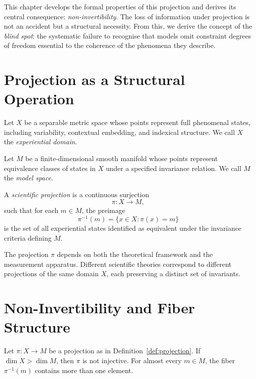 \documentclass[11pt,openany]{book}
\begin{document}
This chapter develops the formal properties of this
projection and derives its central consequence:
\emph{non-invertibility}. The loss of information under
projection is not an accident but a structural necessity.
From this, we derive the concept of the \emph{blind spot}:
the systematic failure to recognise that models omit
constraint degrees of freedom essential to the coherence of
the phenomena they describe.

\section{Projection as a Structural Operation}
\label{sec:projection-structure}

\begin{definition}
Let $X$ be a separable metric space whose points represent
full phenomenal states, including variability, contextual
embedding, and indexical structure. We call $X$ the
\emph{experiential domain}.
\end{definition}

\begin{definition}
Let $M$ be a finite-dimensional smooth manifold whose points
represent equivalence classes of states in $X$ under a
specified invariance relation. We call $M$ the
\emph{model space}.
\end{definition}

\begin{definition}[Projection]
\label{def:projection}
A \emph{scientific projection} is a continuous surjection
\[
  \pi : X \to M,
\]
such that for each $m \in M$, the preimage
\[
  \pi^{-1}(m) = \{x \in X : \pi(x) = m\}
\]
is the set of all experiential states identified as
equivalent under the invariance criteria defining $M$.
\end{definition}

\begin{remark}
The projection $\pi$ depends on both the theoretical
framework and the measurement apparatus. Different
scientific theories correspond to different projections of
the same domain $X$, each preserving a distinct set of
invariants.
\end{remark}

\section{Non-Invertibility and Fiber Structure}
\label{sec:noninvertibility}

\begin{proposition}
\label{prop:noninjective}
Let $\pi : X \to M$ be a projection as in
Definition~\ref{def:projection}. If $\dim X > \dim M$, then
$\pi$ is not injective. For almost every $m \in M$, the
fiber $\pi^{-1}(m)$ contains more than one element.
\end{proposition}
\end{document}
